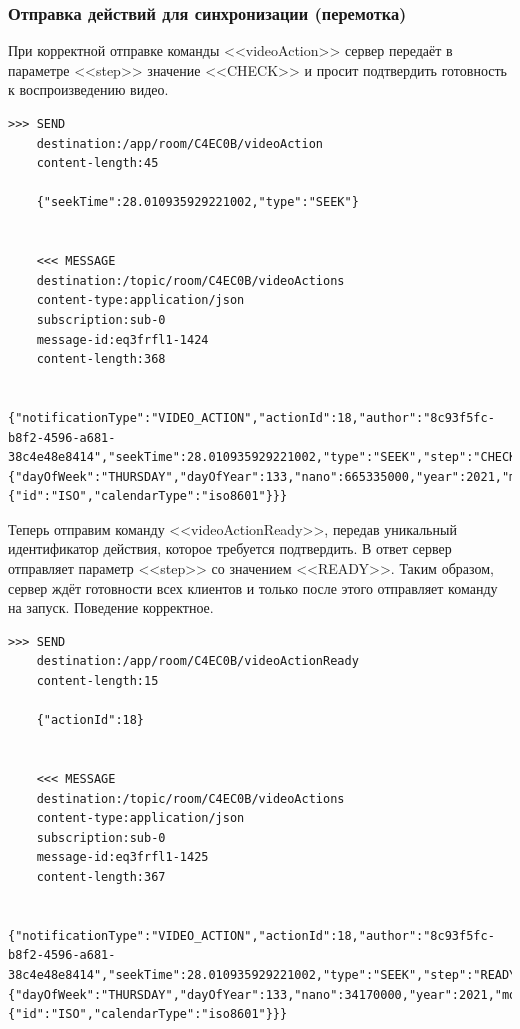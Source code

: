 \documentclass{../../includes/TechDocMultiAuthors}
\begin{document}
    \subsubsection{Отправка действий для синхронизации (перемотка)}

    При корректной отправке команды <<videoAction>> сервер передаёт в параметре <<step>> значение <<CHECK>> и просит подтвердить готовность к воспроизведению видео.

    \begin{lstlisting}[language=text,caption={Запрос и ответ при отправке действия для синхронизации}]
    >>> SEND
    destination:/app/room/C4EC0B/videoAction
    content-length:45

    {"seekTime":28.010935929221002,"type":"SEEK"}


    <<< MESSAGE
    destination:/topic/room/C4EC0B/videoActions
    content-type:application/json
    subscription:sub-0
    message-id:eq3frfl1-1424
    content-length:368

    {"notificationType":"VIDEO_ACTION","actionId":18,"author":"8c93f5fc-b8f2-4596-a681-38c4e48e8414","seekTime":28.010935929221002,"type":"SEEK","step":"CHECK","actionTime":{"dayOfWeek":"THURSDAY","dayOfYear":133,"nano":665335000,"year":2021,"monthValue":5,"dayOfMonth":13,"hour":23,"minute":45,"second":4,"month":"MAY","chronology":{"id":"ISO","calendarType":"iso8601"}}}
    \end{lstlisting}

    Теперь отправим команду <<videoActionReady>>, передав уникальный идентификатор действия, которое требуется подтвердить.
    В ответ сервер отправляет параметр <<step>> со значением <<READY>>.
    Таким образом, сервер ждёт готовности всех клиентов и только после этого отправляет команду на запуск.
    Поведение корректное.

    \begin{lstlisting}[language=text,caption={Подтверждение готовности воспроизвести видео}]
    >>> SEND
    destination:/app/room/C4EC0B/videoActionReady
    content-length:15

    {"actionId":18}


    <<< MESSAGE
    destination:/topic/room/C4EC0B/videoActions
    content-type:application/json
    subscription:sub-0
    message-id:eq3frfl1-1425
    content-length:367

    {"notificationType":"VIDEO_ACTION","actionId":18,"author":"8c93f5fc-b8f2-4596-a681-38c4e48e8414","seekTime":28.010935929221002,"type":"SEEK","step":"READY","actionTime":{"dayOfWeek":"THURSDAY","dayOfYear":133,"nano":34170000,"year":2021,"monthValue":5,"dayOfMonth":13,"hour":23,"minute":45,"second":5,"month":"MAY","chronology":{"id":"ISO","calendarType":"iso8601"}}}
    \end{lstlisting}

    \registrationList
\end{document}
